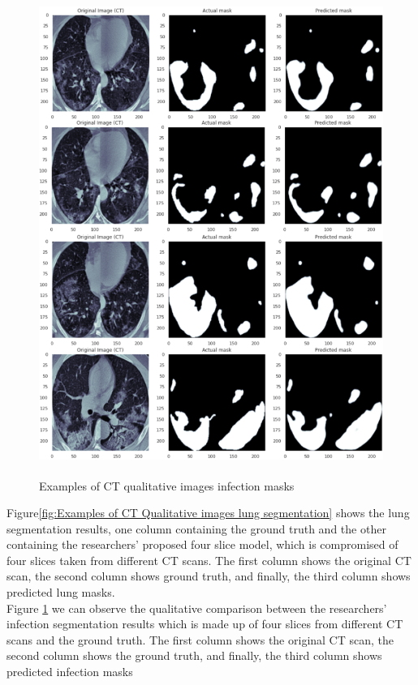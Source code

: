  \begin{figure}[H]
    \centering
    \includegraphics[width=1\textwidth,height=15cm,keepaspectratio]{Images/CTScanQualitativeImage2.png}\\
    \caption{Examples of CT qualitative images infection masks\cite{litReviewDeepLearningCovid19}}
    \label{fig:Examples of CT qualitative images infection masks}
\end{figure}
\vspace{0.5mm}
Figure\ref{fig:Examples of CT Qualitative images lung segmentation} shows the lung segmentation results, one column containing the ground truth and the other containing the researchers' proposed four slice model, which is compromised of four slices taken from different CT scans.  The first column shows the original CT scan, the second column shows ground truth, and finally, the third column shows predicted lung masks.
\\
Figure \ref{fig:Examples of CT qualitative images infection masks} we can observe the qualitative comparison between the researchers' infection segmentation results which is made up of four slices from different CT scans and the ground truth. The first column shows the original CT scan, the second column shows the ground truth, and finally, the third column shows predicted infection masks
